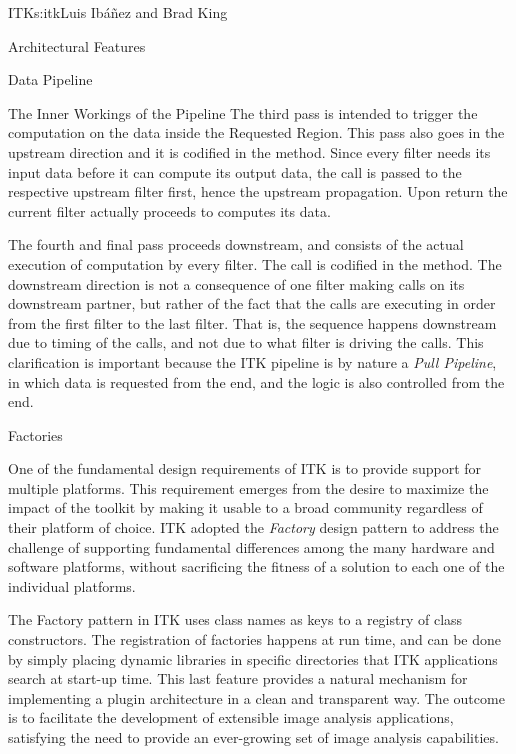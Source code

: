 \begin{aosachapter}{ITK}{s:itk}{Luis Ib\'{a}\~{n}ez and Brad King}
\begin{aosasect1}{Architectural Features}
\begin{aosasect2}{Data Pipeline}
\begin{aosasect3}{The Inner Workings of the Pipeline}
The third pass is intended to trigger the computation on the data inside the
Requested Region. This pass also goes in the upstream direction and
it is codified in the  method.  Since every filter
needs its input data before it can compute its output data, the call is passed
to the respective upstream filter first, hence the upstream propagation. Upon
return the current filter actually proceeds to computes its data.

The fourth and final pass proceeds downstream, and consists of the actual
execution of computation by every filter. The call is codified in the
 method. The downstream direction is not a consequence
of one filter making calls on its downstream partner, but rather of the fact that the 
 calls are executing in order from the
first filter to the last filter. That is, the sequence happens downstream due
to timing of the calls, and not due to what filter is driving the calls. This
clarification is important because the ITK pipeline is by nature a \emph{Pull
Pipeline}, in which data is requested from the end, and the logic is also
controlled from the end.

\end{aosasect3}

\end{aosasect2}

\begin{aosasect2}{Factories}

One of the fundamental design requirements of ITK is to provide support for
multiple platforms. This requirement emerges from the desire to maximize the
impact of the toolkit by making it usable to a broad community regardless of
their platform of choice. ITK adopted the \emph{Factory} design pattern to
address the challenge of supporting fundamental differences among the many
hardware and software platforms, without sacrificing the fitness of a
solution to each one of the individual platforms.

The Factory pattern in ITK uses class names as keys to a registry of class
constructors. The registration of factories happens at run time, and can be
done by simply placing dynamic libraries in specific directories that ITK
applications search at start-up time. This last feature provides a natural
mechanism for implementing a plugin architecture in a clean and transparent
way. The outcome is to facilitate the development of extensible image analysis
applications, satisfying the need to provide an ever-growing set of
image analysis capabilities.


\end{aosasect2}
\end{aosasect1}
\end{aosachapter}
